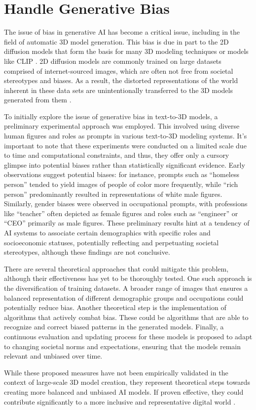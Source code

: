 \section{Handle Generative Bias}

The issue of bias in generative AI has become a critical issue, including in the field of automatic 3D model generation. This bias is due in part to the 2D diffusion models that form the basis for many 3D modeling techniques or models like CLIP \citep{luccioni2023stable,radfordCLIP}. 2D diffusion models are commonly trained on large datasets comprised of internet-sourced images, which are often not free from societal stereotypes and biases. As a result, the distorted representations of the world inherent in these data sets are unintentionally transferred to the 3D models generated from them \citep{buolamwini2018gender}.  

To initially explore the issue of generative bias in text-to-3D models, a preliminary experimental approach was employed. This involved using diverse human figures and roles as prompts in various text-to-3D modeling systems. It's important to note that these experiments were conducted on a limited scale due to time and computational constraints, and thus, they offer only a cursory glimpse into potential biases rather than statistically significant evidence. Early observations suggest potential biases: for instance, prompts such as ``homeless person'' tended to yield images of people of color more frequently, while ``rich person'' predominantly resulted in representations of white male figures. Similarly, gender biases were observed in occupational prompts, with professions like ``teacher'' often depicted as female figures and roles such as ``engineer'' or ``CEO'' primarily as male figures. These preliminary results hint at a tendency of AI systems to associate certain demographics with specific roles and socioeconomic statuses, potentially reflecting and perpetuating societal stereotypes, although these findings are not conclusive.

There are several theoretical approaches that could mitigate this problem, although their effectiveness has yet to be thoroughly tested. One such approach is the diversification of training datasets. A broader range of images that ensures a balanced representation of different demographic groups and occupations could potentially reduce bias. Another theoretical step is the implementation of algorithms that actively combat bias. These could be algorithms that are able to recognize and correct biased patterns in the generated models.  Finally, a continuous evaluation and updating process for these models is proposed to adapt to changing societal norms and expectations, ensuring that the models remain relevant and unbiased over time.

While these proposed measures have not been empirically validated in the context of large-scale 3D model creation, they represent theoretical steps towards creating more balanced and unbiased AI models. If proven effective, they could contribute significantly to a more inclusive and representative digital world \citep{luccioni2023stable}.
